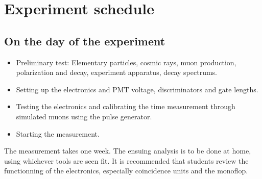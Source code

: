 \chapter*{Experiment schedule}

\section{On the day of the experiment}

\begin{itemize}

\item Preliminary test: Elementary particles, cosmic rays, muon production, polarization and decay, experiment apparatus, decay spectrums.

\item Setting up the electronics and PMT voltage, discriminators and gate lengths.

\item Testing the electronics and calibrating the time measurement through simulated muons using the pulse generator.

\item Starting the measurement.
\end{itemize}

The measurement takes one week. The ensuing analysis is to be done at home, using whichever tools are seen fit. It is recommended that students review the functionning of the electronics, especially coincidence units and the monoflop.



